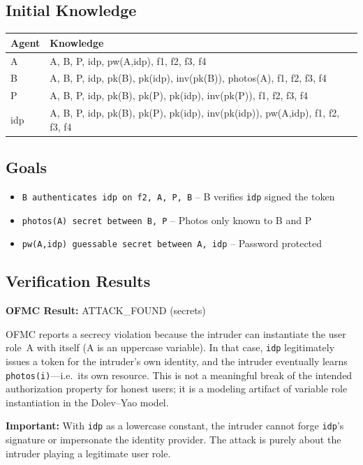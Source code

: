 \documentclass[11pt,a4paper]{article}
\begin{document}
\subsection{Initial Knowledge}
\begin{center}
\begin{tabular}{ll}
\toprule
Agent & Knowledge \\
\midrule
A & A, B, P, idp, pw(A,idp), f1, f2, f3, f4 \\
B & A, B, P, idp, pk(B), pk(idp), inv(pk(B)), photos(A), f1, f2, f3, f4 \\
P & A, B, P, idp, pk(B), pk(P), pk(idp), inv(pk(P)), f1, f2, f3, f4 \\
idp & A, B, P, idp, pk(B), pk(P), pk(idp), inv(pk(idp)), pw(A,idp), f1, f2, f3, f4 \\
\bottomrule
\end{tabular}
\end{center}

\subsection{Goals}
\begin{itemize}[leftmargin=*]
  \item \texttt{B authenticates idp on f2, A, P, B} -- B verifies \texttt{idp} signed the token
  \item \texttt{photos(A) secret between B, P} -- Photos only known to B and P
  \item \texttt{pw(A,idp) guessable secret between A, idp} -- Password protected
\end{itemize}

\subsection{Verification Results}
\textbf{OFMC Result:} ATTACK\_FOUND (secrets)

OFMC reports a secrecy violation because the intruder can instantiate the user role~A with itself
(A is an uppercase variable). In that case, \texttt{idp} legitimately issues a token for the
intruder's own identity, and the intruder eventually learns \texttt{photos(i)}---i.e.\ its own
resource. This is not a meaningful break of the intended authorization property for honest users;
it is a modeling artifact of variable role instantiation in the Dolev--Yao model.

\textbf{Important:} With \texttt{idp} as a lowercase constant, the intruder cannot forge
\texttt{idp}'s signature or impersonate the identity provider. The attack is purely about the
intruder playing a legitimate user role.
\end{document}
